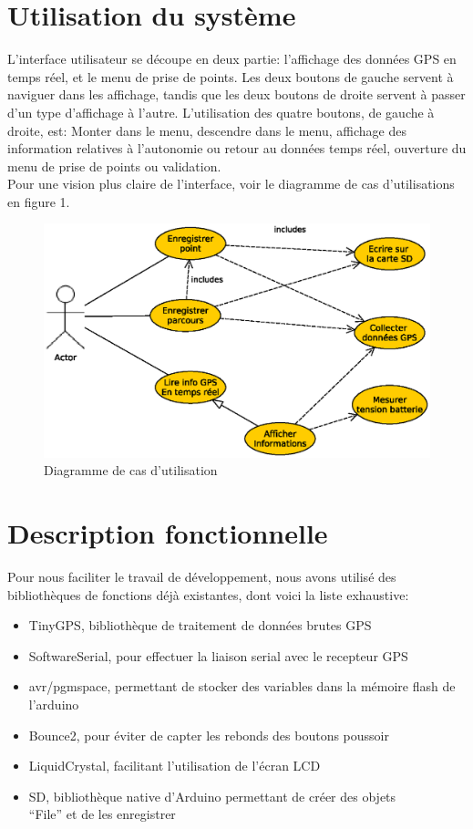 \documentclass[a4paper,12pt]{article}
\begin{document}
\section{Utilisation du système}
L'interface utilisateur se découpe en deux partie: l'affichage des données GPS en temps réel, et le menu de prise de points. Les deux boutons de gauche servent à naviguer dans les affichage, tandis que les deux boutons de droite servent à passer d'un type d'affichage à l'autre. L'utilisation des quatre boutons, de gauche à droite, est:\newline
Monter dans le menu, descendre dans le menu, affichage des information relatives à l'autonomie ou retour au données temps réel, ouverture du menu de prise de points ou validation. \\
Pour une vision plus claire de l'interface, voir le diagramme de cas d'utilisations en figure 1.

\begin{figure}[!ht]
	\begin{center}
		
		\includegraphics[scale = 0.9]{UseCase.eps}
		\caption{Diagramme de cas d'utilisation}
	\end{center}
\end{figure}
\FloatBarrier
\newpage
\section{Description fonctionnelle}
Pour nous faciliter le travail de développement, nous avons utilisé des bibliothèques de fonctions déjà existantes, dont voici la liste exhaustive:
\begin{itemize}
\item TinyGPS, bibliothèque de traitement de données brutes GPS
\item SoftwareSerial, pour effectuer la liaison serial avec le recepteur GPS
\item avr/pgmspace, permettant de stocker des variables dans la mémoire flash de l'arduino
\item Bounce2, pour éviter de capter les rebonds des boutons poussoir
\item LiquidCrystal, facilitant l'utilisation de l'écran LCD
\item SD, bibliothèque native d'Arduino permettant de créer des objets\\ ``File'' et de les enregistrer
\end{itemize}
\end{document}
